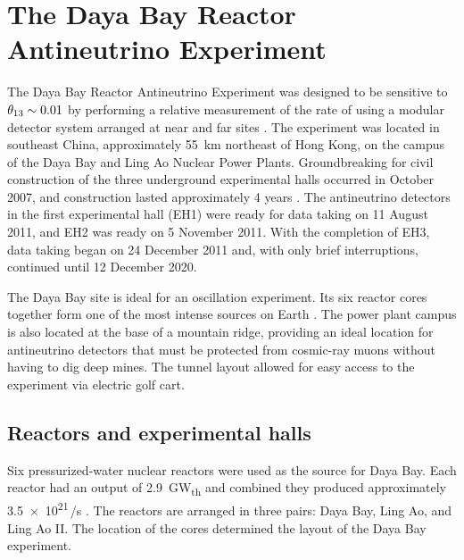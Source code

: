 \chapter{The Daya Bay Reactor Antineutrino Experiment}
\label{ch:detector}

The Daya Bay Reactor Antineutrino Experiment was designed
to be sensitive to $\theta_{13} \sim 0.01$
by performing a relative measurement of the rate of \nuebar{}
using a modular detector system arranged at near and far sites \cite{dybproposal2006}.
The experiment was located in southeast China,
approximately \SI{55}{\km} northeast of Hong Kong,
on the campus of the Daya Bay and Ling Ao Nuclear Power Plants.
Groundbreaking for civil construction of the three underground
experimental halls occurred in October 2007,
and construction lasted approximately 4 years \cite{dyb_overview}.
The antineutrino detectors in the first experimental hall (EH1)
were ready for data taking on 11 August 2011,
and EH2 was ready on 5 November 2011.
With the completion of EH3, data taking began on 24 December 2011
and, with only brief interruptions,
continued until 12 December 2020.

The Daya Bay site is ideal for an oscillation experiment.
Its six reactor cores together form one of the most intense \nuebar{}
sources on Earth \cite{detector_system}.
The power plant campus is also located at the base of a mountain ridge,
providing an ideal location for antineutrino detectors that must be
protected from cosmic-ray muons without having to dig deep mines.
The tunnel layout allowed for easy access to the experiment via electric golf cart.

\section{Reactors and experimental halls}

Six pressurized-water nuclear reactors were used
as the \nuebar{} source for Daya Bay.
Each reactor had an output of \SI{2.9}{\giga\watt_{th}}
and combined they produced approximately \num{3.5e21}\,\nuebar/s \cite{ngd2016}.
The reactors are arranged in three pairs: Daya Bay, Ling Ao, and Ling Ao II.
The location of the cores determined the layout of the Daya Bay experiment.

